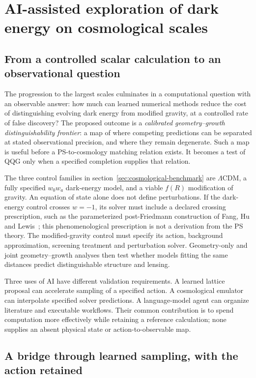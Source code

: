 \section{AI-assisted exploration of dark energy on cosmological scales}
\label{sec:ai-exploration}

\subsection{From a controlled scalar calculation to an observational question}

The progression to the largest scales culminates in a computational question with an observable answer: how much can learned numerical methods reduce the cost of distinguishing evolving dark energy from modified gravity, at a controlled rate of false discovery?  The proposed outcome is a \emph{calibrated geometry--growth distinguishability frontier}: a map of where competing predictions can be separated at stated observational precision, and where they remain degenerate.  Such a map is useful before a PS-to-cosmology matching relation exists.  It becomes a test of QQG only when a specified completion supplies that relation.

The three control families in section~\ref{sec:cosmological-benchmark} are $\Lambda$CDM, a fully specified $w_0w_a$ dark-energy model, and a viable $f(R)$ modification of gravity.  An equation of state alone does not define perturbations.  If the dark-energy control crosses $w=-1$, its solver must include a declared crossing prescription, such as the parameterized post-Friedmann construction of Fang, Hu and Lewis~\cite{FangHuLewis:2008}; this phenomenological prescription is not a derivation from the PS theory.  The modified-gravity control must specify its action, background approximation, screening treatment and perturbation solver.  Geometry-only and joint geometry--growth analyses then test whether models fitting the same distances predict distinguishable structure and lensing.

Three uses of AI have different validation requirements.  A learned lattice proposal can accelerate sampling of a specified action.  A cosmological emulator can interpolate specified solver predictions.  A language-model agent can organize literature and executable workflows.  Their common contribution is to spend computation more effectively while retaining a reference calculation; none supplies an absent physical state or action-to-observable map.

\subsection{A bridge through learned sampling, with the action retained}

